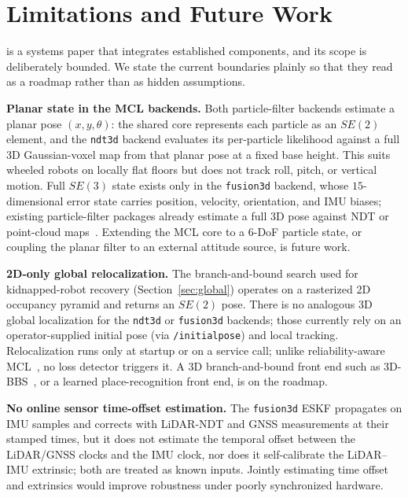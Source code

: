 \section{Limitations and Future Work}\label{sec:limitations}

\prismloc{} is a systems paper that integrates established components,
and its scope is deliberately bounded. We state the current boundaries plainly so that they read as a
roadmap rather than as hidden assumptions.

\textbf{Planar state in the MCL backends.} Both particle-filter
backends estimate a planar pose $(x, y, \theta)$: the shared core
represents each particle as an $SE(2)$ element, and the \texttt{ndt3d}
backend evaluates its per-particle likelihood against a full 3D
Gaussian-voxel map from that planar pose at a fixed base height. This
suits wheeled robots on locally flat floors but does not track roll,
pitch, or vertical motion. Full $SE(3)$ state exists only in the
\texttt{fusion3d} backend, whose $15$-dimensional error state carries
position, velocity, orientation, and IMU biases; existing
particle-filter packages already estimate a full 3D pose against NDT or
point-cloud maps~\cite{puga2024beluga,ekumen2022belugarepo,watanabe2016mcl3dl}.
Extending the MCL core to a $6$-DoF particle state, or coupling the
planar filter to an external attitude source, is future work.

\textbf{2D-only global relocalization.} The branch-and-bound search
used for kidnapped-robot recovery (Section~\ref{sec:global}) operates on
a rasterized 2D occupancy pyramid and returns an $SE(2)$ pose. There is
no analogous 3D global localization for the \texttt{ndt3d} or
\texttt{fusion3d} backends; those currently rely on an operator-supplied
initial pose (via \texttt{/initialpose}) and local tracking.
Relocalization runs only at startup or on a service call; unlike
reliability-aware MCL~\cite{akai2023reliable}, no loss detector
triggers it. A 3D branch-and-bound front end such as
3D-BBS~\cite{aoki2024bbs3d}, or a learned place-recognition front end,
is on the roadmap.

\textbf{No online sensor time-offset estimation.} The
\texttt{fusion3d} ESKF propagates on IMU samples and corrects with
LiDAR-NDT and GNSS measurements at their stamped times, but it does not
estimate the temporal offset between the LiDAR/GNSS clocks and the IMU
clock, nor does it self-calibrate the LiDAR--IMU extrinsic; both are
treated as known inputs. Jointly estimating time offset and extrinsics
would improve robustness under poorly synchronized hardware.

